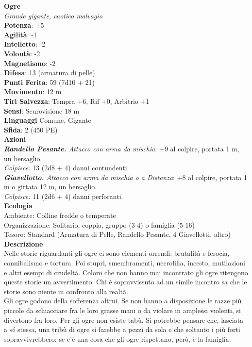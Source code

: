 \begin{multicols}{2}
\medskip\textbf{Ogre}\\
\emph{Grande gigante, caotico malvagio}\\
\textbf{Potenza}: +5\\
\textbf{Agilità}: -1\\
\textbf{Intelletto}: -2\\
\textbf{Volontà}: -2\\
\textbf{Magnetismo}: -2\\
\textbf{Difesa}: 13 (armatura di pelle)\\
\textbf{Punti Ferita}: 59 (7d10 + 21)\\
\textbf{Movimento}: 12 m\\
\textbf{Tiri Salvezza}: Tempra +6, Rif +0, Arbitrio +1\\
\textbf{Sensi}: Scurovisione 18 m\\
\textbf{Linguaggi} Comune, Gigante\\
\textbf{Sfida}: 2 (450 PE)\smallskip\\
\smallskip\textbf{Azioni}\\
\emph{\textbf{Randello Pesante.} Attacco con arma da mischia}: +9 al colpire, portata 1 m, un bersaglio.\\
\emph{Colpisce:} 13 (2d8 + 4) danni contundenti.\\
\emph{\textbf{Giavellotto.} Attacco con arma da mischia o a Distanza}: +8 al colpire, portata 1 m o gittata 12 m, un bersaglio.\\
\emph{Colpisce:} 11 (2d6 + 4) danni perforanti.\\
\textbf{Ecologia}\\
Ambiente: Colline fredde o temperate\\
Organizzazione: Solitario, coppia, gruppo (3-4) o famiglia (5-16)\\
Tesoro: Standard (Armatura di Pelle, Randello Pesante, 4 Giavellotti, altro)\\
\textbf{Descrizione}\\
Nelle storie riguardanti gli ogre ci sono elementi orrendi: brutalità e ferocia, cannibalismo e tortura. Poi stupri, smembramenti, necrofilia, incesto, mutilazioni e altri esempi di crudeltà. Coloro che non hanno mai incontrato gli ogre ritengono queste storie un avvertimento. Chi è sopravvissuto ad un simile incontro sa che le storie sono niente in confronto alla realtà.\\

Gli ogre godono della sofferenza altrui. Se non hanno a disposizione le razze più piccole da schiacciare fra le loro grasse mani o da violare in amplessi violenti, si divertono fra loro. Per gli ogre non esiste tabù. Si potrebbe pensare che, lasciata a sé stessa, una tribù di ogre si farebbe a pezzi da sola e che soltanto i più forti sopravvivrebbero: se c’è una cosa che gli ogre rispettano, però, è la famiglia.\\


\end{multicols}
